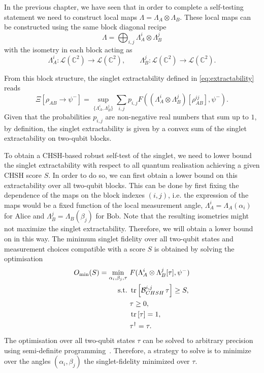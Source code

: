 In the previous chapter, we have seen that in order to complete a self-testing statement we need to construct local maps $\Lambda = \Lambda_A \otimes \Lambda_B$.
These local maps can be constructed using the same block diagonal recipe 
\begin{equation}
		\Lambda = \bigoplus_{i,j} \Lambda_A^i \otimes \Lambda_B^j
\end{equation}
with the isometry in each block acting as
\begin{equation}
	\Lambda_A^i: \mathcal{L}(\mathds{C}^2) \rightarrow \mathcal{L}(\mathds{C}^2), \qquad \Lambda_B^j: \mathcal{L}(\mathds{C}^2) \rightarrow \mathcal{L}(\mathds{C}^2).
\end{equation}

From this block structure, the singlet extractability defined in \eqref{eq:extractability} reads
\begin{equation}
	\Xi [\rho_{AB} \rightarrow \psi^{-}] = \sup_{\{\Lambda_A^i,\Lambda_B^j\}} \sum_{i,j} p_{i,j} F((\Lambda_A^i \otimes \Lambda_B^j)[\rho_{AB}^{ij}],\psi^{-}).
	\label{eq:block_extractability}
\end{equation}
Given that the probabilities $p_{i,j}$ are non-negative real numbers that sum up to $1$, by definition, the singlet extractability is given by a convex sum of the singlet extractability on two-qubit blocks.

\medbreak

To obtain a CHSH-based robust self-test of the singlet, we need to lower bound the singlet extractability with respect to all quantum realisation achieving a given CHSH score $S$.
In order to do so, we can first obtain a lower bound on this extractability over all two-qubit blocks.
This can be done by first fixing the dependence of the maps on the block indexes $(i,j)$, i.e. the expression of the maps would be a fixed function of the local measurement angle, $\Lambda_A^i = \Lambda_A(\alpha_i)$ for Alice and $\Lambda_B^j = \Lambda_B(\beta_j)$  for Bob.
Note that the resulting isometries might not maximize the singlet extractability.
Therefore, we will obtain a lower bound on  in this way.
The minimum singlet fidelity over all two-qubit states and measurement choices compatible with a score $S$ is obtained by solving the optimisation
\begin{equation}
	\begin{split}
		O_{\min}(S)=\min_{\alpha_i, \beta_j, \tau} \-\ & F(\Lambda_A^i \otimes\Lambda_B^j [\tau] ,\psi^-)\\
		\text{s.t.} \-\ &\trr{\mathcal{B}_{CHSH}^{i,j}\, \tau} \geq S,\\
		& \tau \geq 0,\\
		& \trr{\tau} =1,\\
		& \tau^\dag = \tau.
	\end{split}
	\label{eq:sdp_extractability}
\end{equation}
The optimisation over all two-qubit states $\tau$ can be solved to arbitrary precision using semi-definite programming~\cite{Skrzypczyk2023}. 
Therefore, a strategy to solve  is to minimize over the angles $(\alpha_i,\beta_j)$ the singlet-fidelity minimized over $\tau$.


